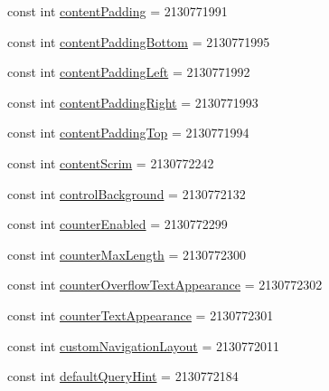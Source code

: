\begin{DoxyCompactItemize}
\item 
const int \mbox{\hyperlink{class_f_w_p_s___app_1_1_droid_1_1_resource_1_1_attribute_aca15c69491ffa977f3ba641f1592ddfd}{content\+Padding}} = 2130771991
\item 
const int \mbox{\hyperlink{class_f_w_p_s___app_1_1_droid_1_1_resource_1_1_attribute_a438f08b31aae2bd0d2751b6713ca73de}{content\+Padding\+Bottom}} = 2130771995
\item 
const int \mbox{\hyperlink{class_f_w_p_s___app_1_1_droid_1_1_resource_1_1_attribute_afa656abadf09a46ebd6f7eeb98d6c82a}{content\+Padding\+Left}} = 2130771992
\item 
const int \mbox{\hyperlink{class_f_w_p_s___app_1_1_droid_1_1_resource_1_1_attribute_a357675d8d4396754bee2b834cf49ceaf}{content\+Padding\+Right}} = 2130771993
\item 
const int \mbox{\hyperlink{class_f_w_p_s___app_1_1_droid_1_1_resource_1_1_attribute_a249c9167a8582377ae41c8d0b0e5b3a7}{content\+Padding\+Top}} = 2130771994
\item 
const int \mbox{\hyperlink{class_f_w_p_s___app_1_1_droid_1_1_resource_1_1_attribute_a7e88c49b7704b75d81fc651103d46896}{content\+Scrim}} = 2130772242
\item 
const int \mbox{\hyperlink{class_f_w_p_s___app_1_1_droid_1_1_resource_1_1_attribute_a3dbe284f7159547fa2503d1afa984ddd}{control\+Background}} = 2130772132
\item 
const int \mbox{\hyperlink{class_f_w_p_s___app_1_1_droid_1_1_resource_1_1_attribute_a7abaddfb1b33c1d6a58c90505b388de0}{counter\+Enabled}} = 2130772299
\item 
const int \mbox{\hyperlink{class_f_w_p_s___app_1_1_droid_1_1_resource_1_1_attribute_a90eccfca64004ada90b5b80e0892b245}{counter\+Max\+Length}} = 2130772300
\item 
const int \mbox{\hyperlink{class_f_w_p_s___app_1_1_droid_1_1_resource_1_1_attribute_aa09695d63b393d614b38872b9f6b998b}{counter\+Overflow\+Text\+Appearance}} = 2130772302
\item 
const int \mbox{\hyperlink{class_f_w_p_s___app_1_1_droid_1_1_resource_1_1_attribute_a89f5347f1a09b1d3117de25478733a5c}{counter\+Text\+Appearance}} = 2130772301
\item 
const int \mbox{\hyperlink{class_f_w_p_s___app_1_1_droid_1_1_resource_1_1_attribute_afc0ae287991d10069fcc03c26f745598}{custom\+Navigation\+Layout}} = 2130772011
\item 
const int \mbox{\hyperlink{class_f_w_p_s___app_1_1_droid_1_1_resource_1_1_attribute_af775412ca54d50290effa8ec9ea0b6eb}{default\+Query\+Hint}} = 2130772184

\end{DoxyCompactItemize}
